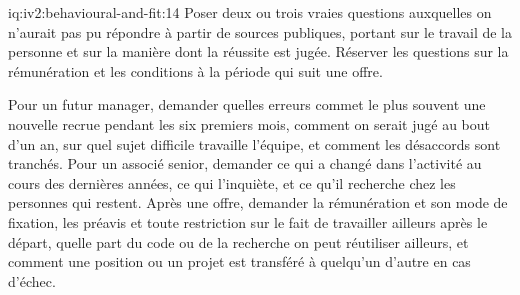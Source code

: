 \begin{solution}{iq:iv2:behavioural-and-fit:14}
Poser deux ou trois vraies questions auxquelles on n'aurait pas pu répondre à partir de sources publiques, portant sur le travail de la personne et sur la manière dont la réussite est jugée. Réserver les questions sur la rémunération et les conditions à la période qui suit une offre.

Pour un futur manager, demander quelles erreurs commet le plus souvent une nouvelle recrue pendant les six premiers mois, comment on serait jugé au bout d'un an, sur quel sujet difficile travaille l'équipe, et comment les désaccords sont tranchés. Pour un associé senior, demander ce qui a changé dans l'activité au cours des dernières années, ce qui l'inquiète, et ce qu'il recherche chez les personnes qui restent. Après une offre, demander la rémunération et son mode de fixation, les préavis et toute restriction sur le fait de travailler ailleurs après le départ, quelle part du code ou de la recherche on peut réutiliser ailleurs, et comment une position ou un projet est transféré à quelqu'un d'autre en cas d'échec.

\end{solution}

